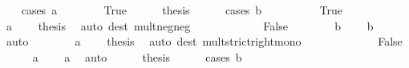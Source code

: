 \begin{isabellebody}
\ \ \isamarkupfalse%
\ {\isacharparenleft}{\kern0pt}cases\ {\isachardoublequoteopen}a\ {\isacharless}{\kern0pt}\ {}{\isachardoublequoteclose}{\isacharparenright}{\kern0pt}\isanewline
\ \ \ \ \isamarkupfalse%
\ True\isanewline
\ \ \ \ \isamarkupfalse%
\ {\isacharquery}{\kern0pt}thesis\isanewline
\ \ \ \ \isamarkupfalse%
\ {\isacharparenleft}{\kern0pt}cases\ {\isachardoublequoteopen}b\ {\isacharless}{\kern0pt}\ {}{\isachardoublequoteclose}{\isacharparenright}{\kern0pt}\isanewline
\ \ \ \ \ \ \isamarkupfalse%
\ True\isanewline
\ \ \ \ \ \ \isamarkupfalse%
\ {\isacartoucheopen}a\ {\isacharless}{\kern0pt}\ {}{\isacartoucheclose}\ \isamarkupfalse%
\ {\isacharquery}{\kern0pt}thesis\ \isamarkupfalse%
\ {\isacharparenleft}{\kern0pt}auto\ dest{\isacharcolon}{\kern0pt}\ mult{\isacharunderscore}{\kern0pt}neg{\isacharunderscore}{\kern0pt}neg{\isacharparenright}{\kern0pt}\isanewline
\ \ \ \ \isamarkupfalse%
\isanewline
\ \ \ \ \ \ \isamarkupfalse%
\ False\isanewline
\ \ \ \ \ \ \isamarkupfalse%
\ b\ \isamarkupfalse%
\ {\isachardoublequoteopen}{}\ {\isacharless}{\kern0pt}\ b{\isachardoublequoteclose}\ \isamarkupfalse%
\ auto\isanewline
\ \ \ \ \ \ \isamarkupfalse%
\ {\isacartoucheopen}a\ {\isacharless}{\kern0pt}\ {}{\isacartoucheclose}\ \isamarkupfalse%
\ {\isacharquery}{\kern0pt}thesis\ \isamarkupfalse%
\ {\isacharparenleft}{\kern0pt}auto\ dest{\isacharcolon}{\kern0pt}\ mult{\isacharunderscore}{\kern0pt}strict{\isacharunderscore}{\kern0pt}right{\isacharunderscore}{\kern0pt}mono{\isacharparenright}{\kern0pt}\isanewline
\ \ \ \ \isamarkupfalse%
\isanewline
\ \ \isamarkupfalse%
\isanewline
\ \ \ \ \isamarkupfalse%
\ False\isanewline
\ \ \ \ \isamarkupfalse%
\ a\ \isamarkupfalse%
\ {\isachardoublequoteopen}{}\ {\isacharless}{\kern0pt}\ a{\isachardoublequoteclose}\ \isamarkupfalse%
\ auto\isanewline
\ \ \ \ \isamarkupfalse%
\ {\isacharquery}{\kern0pt}thesis\isanewline
\ \ \ \ \isamarkupfalse%
\ {\isacharparenleft}{\kern0pt}cases\ {\isachardoublequoteopen}b\ {\isacharless}{\kern0pt}\ {}{\isachardoublequoteclose}{\isacharparenright}{\kern0pt}\isanewline
\ \ \ \ \ \ \isamarkupfalse%

\end{isabellebody}
